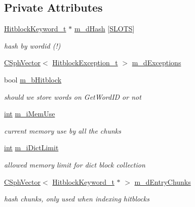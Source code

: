 \subsection*{Private Attributes}
\begin{DoxyCompactItemize}
\item 
\hyperlink{structCSphDictKeywords_1_1HitblockKeyword__t}{Hitblock\-Keyword\-\_\-t} $\ast$ \hyperlink{classCSphDictKeywords_a011ad3a98db6ae7a6f123a1bd46e6edc}{m\-\_\-d\-Hash} \mbox{[}\hyperlink{classCSphDictKeywords_a3ac7bc30b9bf83c02625ef675c5a4c82}{S\-L\-O\-T\-S}\mbox{]}
\begin{DoxyCompactList}\small\item\em hash by wordid (!) \end{DoxyCompactList}\item 
\hyperlink{classCSphVector}{C\-Sph\-Vector}$<$ \hyperlink{structCSphDictKeywords_1_1HitblockException__t}{Hitblock\-Exception\-\_\-t} $>$ \hyperlink{classCSphDictKeywords_a9972e58752289ba840cee41455c7131e}{m\-\_\-d\-Exceptions}
\item 
bool \hyperlink{classCSphDictKeywords_ad5633845850728ca963b77e62ccd5a44}{m\-\_\-b\-Hitblock}
\begin{DoxyCompactList}\small\item\em should we store words on Get\-Word\-I\-D or not \end{DoxyCompactList}\item 
\hyperlink{sphinxexpr_8cpp_a4a26e8f9cb8b736e0c4cbf4d16de985e}{int} \hyperlink{classCSphDictKeywords_ab869747f899fc47a56ab0a8205f69ab7}{m\-\_\-i\-Mem\-Use}
\begin{DoxyCompactList}\small\item\em current memory use by all the chunks \end{DoxyCompactList}\item 
\hyperlink{sphinxexpr_8cpp_a4a26e8f9cb8b736e0c4cbf4d16de985e}{int} \hyperlink{classCSphDictKeywords_a25baa11745a7d9bdc41b1f17455b20b4}{m\-\_\-i\-Dict\-Limit}
\begin{DoxyCompactList}\small\item\em allowed memory limit for dict block collection \end{DoxyCompactList}\item 
\hyperlink{classCSphVector}{C\-Sph\-Vector}$<$ \hyperlink{structCSphDictKeywords_1_1HitblockKeyword__t}{Hitblock\-Keyword\-\_\-t} $\ast$ $>$ \hyperlink{classCSphDictKeywords_a10672cecefb227fec7ee87fc876b3343}{m\-\_\-d\-Entry\-Chunks}
\begin{DoxyCompactList}\small\item\em hash chunks, only used when indexing hitblocks \end{DoxyCompactList}\item 

\end{DoxyCompactItemize}
